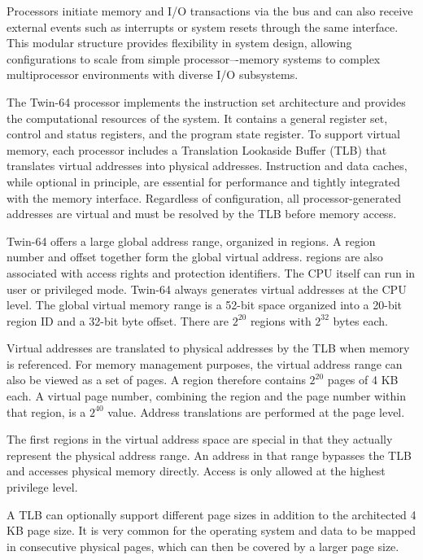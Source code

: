 Processors initiate memory and I/O transactions via the bus and can also receive external events such as interrupts or system resets through the same interface. This modular structure provides flexibility in system design, allowing configurations to scale from simple processor–-memory systems to complex multiprocessor environments with diverse I/O subsystems.


The Twin-64 processor implements the instruction set architecture and provides the computational resources of the system. It contains a general register set, control and status registers, and the program state register. To support virtual memory, each processor includes a Translation Lookaside Buffer (TLB) that translates virtual addresses into physical addresses. Instruction and data caches, while optional in principle, are essential for performance and tightly integrated with the memory interface. Regardless of configuration, all processor-generated addresses are virtual and must be resolved by the TLB before memory access.


Twin-64 offers a large global address range, organized in regions. A region number and offset together form the global virtual address. regions are also associated with access rights and protection identifiers. The CPU itself can run in user or privileged mode. Twin-64 always generates virtual addresses at the CPU level. The global virtual memory range is a 52-bit space organized into a 20-bit region ID and a 32-bit byte offset. There are $2^{20}$ regions with $2^{32}$ bytes each.

Virtual addresses are translated to physical addresses by the TLB when memory is referenced. For memory management purposes, the virtual address range can also be viewed as a set of pages. A region therefore contains $2^{20}$ pages of 4 KB each. A virtual page number, combining the region and the page number within that region, is a $2^{40}$ value. Address translations are performed at the page level. 

The first regions in the virtual address space are special in that they actually represent the physical address range. An address in that range bypasses the TLB and accesses physical memory directly. Access is only allowed at the highest privilege level.

A TLB can optionally support different page sizes in addition to the architected 4 KB page size. It is very common for the operating system and data to be mapped in consecutive physical pages, which can then be covered by a larger page size.

